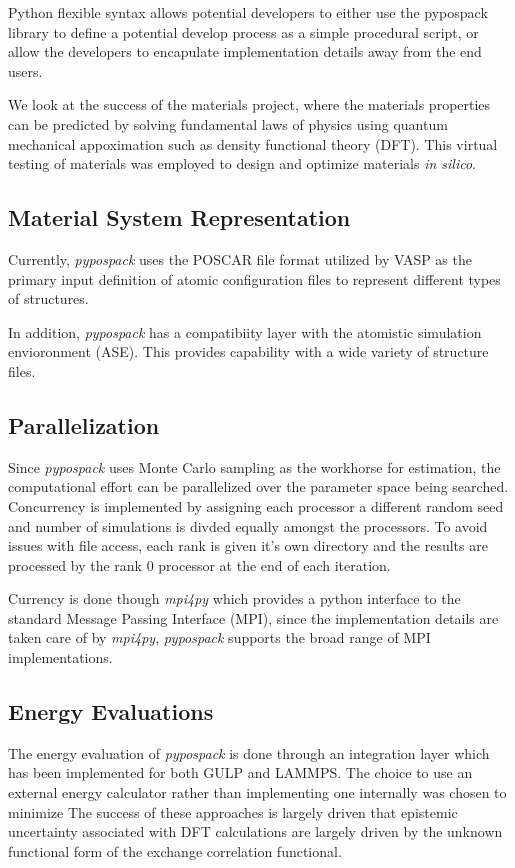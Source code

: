 Python flexible syntax allows potential developers to either use the pypospack library to define a potential develop process as a simple procedural script, or allow the developers to encapulate implementation details away from the end users.

We look at the success of the materials project, where the materials properties can be predicted by solving fundamental laws of physics using quantum mechanical appoximation such as density functional theory (DFT).  This virtual testing of materials was employed to design and optimize materials \emph{in silico}.

\subsection{Material System Representation}

Currently, \emph{pypospack} uses the POSCAR file format utilized by VASP as the primary input definition of atomic configuration files to represent different types of structures.

In addition, \emph{pypospack} has a compatibiity layer with the atomistic simulation envioronment (ASE).  This provides capability with a wide variety of structure files.

\subsection{Parallelization}

Since \emph{pypospack} uses Monte Carlo sampling as the workhorse for estimation, the computational effort can be parallelized over the parameter space being searched.  Concurrency is implemented by assigning each processor a different random seed and number of simulations is divded equally amongst the processors.  To avoid issues with file access, each rank is given it's own directory and the results are processed by the rank $0$ processor at the end of each iteration.

Currency is done though \emph{mpi4py} which provides a python interface to the standard Message Passing Interface (MPI), since the implementation details are taken care of by \emph{mpi4py}, \emph{pypospack} supports the broad range of MPI implementations.

\subsection{Energy Evaluations}

The energy evaluation of \emph{pypospack} is done through an integration layer which has been implemented for both GULP and LAMMPS.  The choice to use an external energy calculator rather than implementing one internally was chosen to minimize
The success of these approaches is largely driven that epistemic uncertainty associated with DFT calculations are largely driven by the unknown functional form of the exchange correlation functional.

